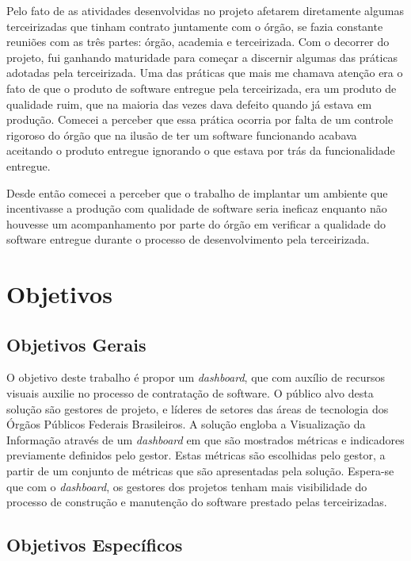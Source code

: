 	Pelo fato de as atividades desenvolvidas no projeto afetarem diretamente algumas terceirizadas que tinham contrato juntamente com o órgão, se fazia constante reuniões com as três partes: órgão, academia e terceirizada. Com o decorrer do projeto, fui ganhando maturidade para começar a discernir algumas das práticas adotadas pela terceirizada. Uma das práticas que mais me chamava atenção era o fato de que o produto de software entregue pela terceirizada, era um produto de qualidade ruim, que na maioria das vezes dava defeito quando já estava em produção. Comecei a perceber que essa prática ocorria por falta de um controle rigoroso do órgão que na ilusão de ter um software funcionando acabava aceitando o produto entregue ignorando o que estava por trás da funcionalidade entregue.
	
	Desde então comecei a perceber que o trabalho de implantar um ambiente que incentivasse a produção com qualidade de software seria ineficaz enquanto não houvesse um acompanhamento por parte do órgão em verificar a qualidade do software entregue durante o processo de desenvolvimento pela terceirizada.


	\section{Objetivos}

	\subsection{Objetivos Gerais} %
	\label{sub:objetivos_gerais}
	
	O objetivo deste trabalho é propor um \textit{dashboard}, que com auxílio de recursos visuais auxilie no processo de contratação de software. O público alvo desta solução são gestores de projeto, e líderes de setores das áreas de tecnologia dos Órgãos Públicos Federais Brasileiros. A solução engloba a Visualização da Informação através de um \textit{dashboard} em que são mostrados métricas e indicadores previamente definidos pelo gestor. Estas métricas são escolhidas pelo gestor, a partir de um conjunto de métricas que são apresentadas pela solução. Espera-se que com o \textit{dashboard}, os gestores dos projetos tenham mais visibilidade do processo de construção e manutenção do software prestado pelas terceirizadas.


	\subsection{Objetivos Específicos} %
	\label{sub:objetivos_específicos}

